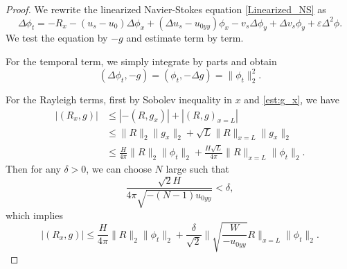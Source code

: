 \documentclass[10pt,a4paper]{amsart}
\begin{document}
\begin{proof}
We rewrite the linearized Navier-Stokes equation \eqref{Linearized_NS} as
$$
\Delta \phi_t = - R_x -(u_s - u_0) \Delta \phi_x + (\Delta u_s - u_{0yy}) \phi_x - v_s \Delta \phi_y + \Delta v_s \phi_y + \varepsilon \Delta^2 \phi.
$$
We test the equation by $-g$ and estimate term by term.

For the temporal term, we simply integrate by parts and obtain
\begin{equation}\label{Dual_1}
(\Delta \phi_t, -g) = (\phi_t , - \Delta g) = \| \phi_t\|_2^2.
\end{equation}

For the Rayleigh terms, first by Sobolev inequality in $x$ and \eqref{est:g_x}, we have
\begin{align*}
|(R_x, g)| &\le |-(R,g_x)| + |(R,g)_{x=L}|\\
&\le \|R\|_2 \|g_x\|_2 + \sqrt{L}\|R\|_{x=L}\|g_x\|_2\\
&\le \frac{H}{4\pi} \|R\|_2 \|\phi_t\|_2 + \frac{H\sqrt{L}}{4\pi} \|R\|_{x=L} \| \phi_t\|_2.
\end{align*}
Then for any $\delta > 0$, we can choose $N$ large such that
$$
\frac{\sqrt{2}H}{4\pi \sqrt{-(N-1)u_{0yy}}} < \delta,
$$
which implies
\begin{equation}\label{Dual_2}
|(R_x, g)| \le \frac{H}{4\pi} \|R\|_2 \|\phi_t\|_2 + \frac{\delta}{\sqrt{2}} \| \sqrt{\frac{W}{-u_{0yy}}} R\|_{x= L} \| \phi_t\|_2.
\end{equation}


\end{proof}
\end{document}
